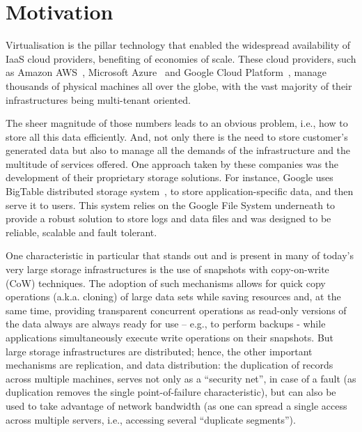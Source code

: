 \section{Motivation} %
\label{sec:intro_motivation}

Virtualisation is the pillar technology that enabled the widespread availability of IaaS cloud providers, benefiting of economies of scale. These cloud providers, such as Amazon AWS~\cite{aws_2017}, Microsoft Azure~\cite{azure_2017} and Google Cloud Platform~\cite{gcp_2017}, manage thousands of physical machines all over the globe, with the vast majority of their infrastructures being multi-tenant oriented.

The sheer magnitude of those numbers leads to an obvious problem, i.e., how to store all this data efficiently. And, not only there is the need to store customer’s generated data but also to manage all the demands of the infrastructure and the multitude of services offered. One approach taken by these companies was the development of their proprietary storage solutions. For instance, Google uses BigTable distributed storage system~\cite{Chang2006}, to store application-specific data, and then serve it to users. This system relies on the Google File System underneath to provide a robust solution to store logs and data files and was designed to be reliable, scalable and fault tolerant.

One characteristic in particular that stands out and is present in many of today’s very large storage infrastructures is the use of snapshots with copy-on-write (CoW) techniques. The adoption of such mechanisms allows for quick copy operations (a.k.a. cloning) of large data sets while saving resources and, at the same time, providing transparent concurrent operations as read-only versions of the data always are always ready for use – e.g., to perform backups - while applications simultaneously execute write operations on their snapshots. But large storage infrastructures are distributed; hence, the other important mechanisms are replication, and data distribution: the duplication of records across multiple machines, serves not only as a “security net”, in case of a fault (as duplication removes the single point-of-failure characteristic), but can also be used to take advantage of network bandwidth (as one can spread a single access across multiple servers, i.e., accessing several “duplicate segments”).


